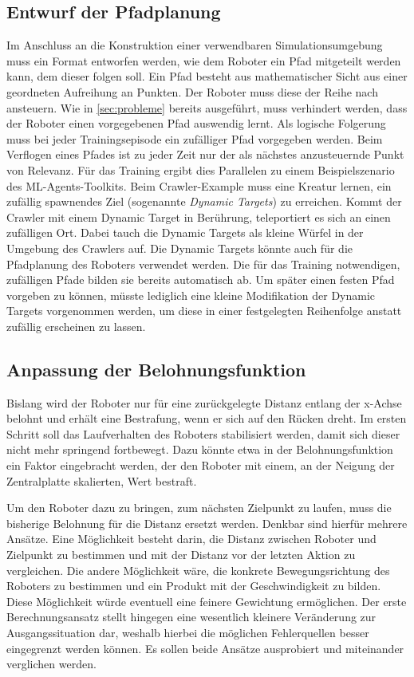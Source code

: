 \subsection{Entwurf der Pfadplanung}
Im Anschluss an die Konstruktion einer verwendbaren Simulationsumgebung muss ein Format entworfen werden, wie dem Roboter ein Pfad mitgeteilt werden kann, dem dieser folgen soll.
Ein Pfad besteht aus mathematischer Sicht aus einer geordneten Aufreihung an Punkten.
Der Roboter muss diese der Reihe nach ansteuern.
Wie in \autoref{sec:probleme} bereits ausgeführt, muss verhindert werden, dass der Roboter einen vorgegebenen Pfad auswendig lernt.
Als logische Folgerung muss bei jeder Trainingsepisode ein zufälliger Pfad vorgegeben werden.
Beim Verflogen eines Pfades ist zu jeder Zeit nur der als nächstes anzusteuernde Punkt von Relevanz.
Für das Training ergibt dies Parallelen zu einem Beispielszenario des ML-Agents-Toolkits.
Beim Crawler-Example muss eine Kreatur lernen, ein zufällig spawnendes Ziel (sogenannte \emph{Dynamic Targets}) zu erreichen.
Kommt der Crawler mit einem Dynamic Target in Berührung, teleportiert es sich an einen zufälligen Ort. \cite{crawlerExample}
Dabei tauch die Dynamic Targets als kleine Würfel in der Umgebung des Crawlers auf.
Die Dynamic Targets könnte auch für die Pfadplanung des Roboters verwendet werden.
Die für das Training notwendigen, zufälligen Pfade bilden sie bereits automatisch ab.
Um später einen festen Pfad vorgeben zu können, müsste lediglich eine kleine Modifikation der Dynamic Targets vorgenommen werden, um diese in einer festgelegten Reihenfolge anstatt zufällig erscheinen zu lassen.

\subsection{Anpassung der Belohnungsfunktion}
Bislang wird der Roboter nur für eine zurückgelegte Distanz entlang der x-Achse belohnt und erhält eine Bestrafung, wenn er sich auf den Rücken dreht.
Im ersten Schritt soll das Laufverhalten des Roboters stabilisiert werden, damit sich dieser nicht mehr springend fortbewegt.
Dazu könnte etwa in der Belohnungsfunktion ein Faktor eingebracht werden, der den Roboter mit einem, an der Neigung der Zentralplatte skalierten, Wert bestraft.

Um den Roboter dazu zu bringen, zum nächsten Zielpunkt zu laufen, muss die bisherige Belohnung für die Distanz ersetzt werden.
Denkbar sind hierfür mehrere Ansätze.
Eine Möglichkeit besteht darin, die Distanz zwischen Roboter und Zielpunkt zu bestimmen und mit der Distanz vor der letzten Aktion zu vergleichen.
Die andere Möglichkeit wäre, die konkrete Bewegungsrichtung des Roboters zu bestimmen und ein Produkt mit der Geschwindigkeit zu bilden.
Diese Möglichkeit würde eventuell eine feinere Gewichtung ermöglichen.
Der erste Berechnungsansatz stellt hingegen eine wesentlich kleinere Veränderung zur Ausgangssituation dar, weshalb hierbei die möglichen Fehlerquellen besser eingegrenzt werden können.
Es sollen beide Ansätze ausprobiert und miteinander verglichen werden.

